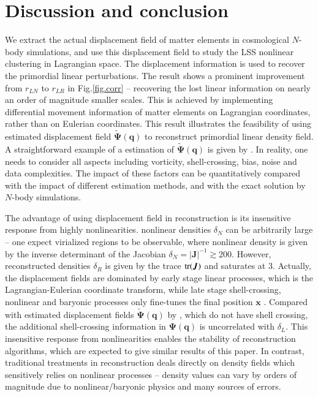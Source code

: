 \documentclass[aps,prd,twocolumn,superscriptaddress,amsfont,amssymb,amsmath,nofootinbib,showpacs,balancelastpage]{revtex4-1}
\newcommand{\bs}{\boldsymbol}
\newcommand{\tcr}{\textcolor{red}}
\begin{document}
\section{Discussion and conclusion}\label{sec.discussion}
We extract the actual displacement field of matter elements in cosmological $N$-body
simulations, and use this displacement field to study the LSS nonlinear
clustering in Lagrangian space. The displacement information is used to recover
the primordial linear perturbations. The result shows a prominent improvement from
$r_{LN}$ to $r_{LR}$ in Fig.\ref{fig.corr} -- recovering the lost linear information on
nearly an order of magnitude smaller scales.
This is achieved by implementing differential movement information
of matter elements on Lagrangian coordinates, rather than on
Eulerian coordinates. This result illustrates the feasibility
of using estimated displacement field $\tilde{\bs \Psi}(\bs q)$ to reconstruct primordial linear
density field. A straightforward example of a estimation of $\tilde{\bs \Psi}(\bs q)$
is given by \cite{1995ApJS..100..269P,1998ApJS..115...19P}.
In reality, one needs
to consider all aspects including vorticity, shell-crossing, bias, noise
and data complexities. The impact of these factors can be quantitatively
compared with the impact of different estimation methods, and with
the exact solution by $N$-body simulations.

The advantage of using displacement field in reconstruction is
its insensitive response from highly nonlinearities.
nonlinear densities $\delta_N$ can be arbitrarily large -- 
one expect virialized regions to be observable, where nonlinear
density is given by the inverse determinant of the Jacobian
$\delta_N=|\bs J|^{-1}\gtrsim 200$.
However, reconstructed densities $\delta_R$ is given by
the trace $\rm{tr}(\bs J)$ and saturates at 3.
Actually, the displacement fields are dominated by early stage linear processes,
which is the Lagrangian-Eulerian coordinate transform,
while late stage shell-crossing, nonlinear and baryonic processes
only fine-tunes the final position $\bs x$
\citep{2014PhRvD..89h3515C}. Compared with estimated displacement fields $\tilde{\bs \Psi}(\bs q)$
by \cite{1995ApJS..100..269P}, which do not have shell crossing,
the additional shell-crossing information in $\bs\Psi(\bs q)$
is uncorrelated with $\delta_L$. This insensitive response from
nonlinearities enables the stability of reconstruction algorithms,
which are expected to give similar results of this paper. 
In contrast, traditional
treatments in reconstruction deals directly on density fields which sensitively
relies on nonlinear processes --  density values can vary by orders
of magnitude due to nonlinear/baryonic physics and many sources of errors.
\end{document}
